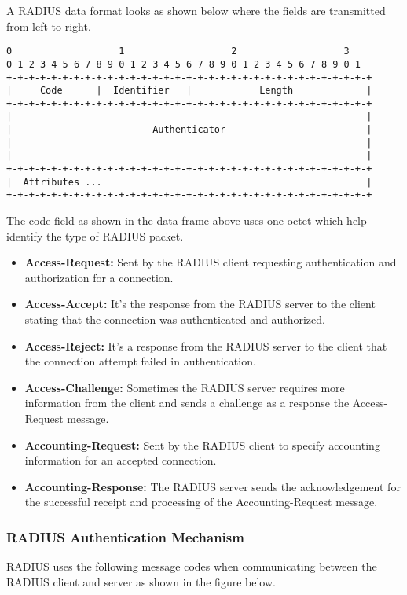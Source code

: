 A RADIUS data format looks as shown below where the fields are transmitted from left to right.

\begin{lstlisting}
0                   1                   2                   3
0 1 2 3 4 5 6 7 8 9 0 1 2 3 4 5 6 7 8 9 0 1 2 3 4 5 6 7 8 9 0 1
+-+-+-+-+-+-+-+-+-+-+-+-+-+-+-+-+-+-+-+-+-+-+-+-+-+-+-+-+-+-+-+-+
|     Code      |  Identifier   |            Length             |
+-+-+-+-+-+-+-+-+-+-+-+-+-+-+-+-+-+-+-+-+-+-+-+-+-+-+-+-+-+-+-+-+
|                                                               |
|                         Authenticator                         |
|                                                               |
|                                                               |
+-+-+-+-+-+-+-+-+-+-+-+-+-+-+-+-+-+-+-+-+-+-+-+-+-+-+-+-+-+-+-+-+
|  Attributes ...												|
+-+-+-+-+-+-+-+-+-+-+-+-+-+-+-+-+-+-+-+-+-+-+-+-+-+-+-+-+-+-+-+-+

\end{lstlisting}

The code field as shown in the data frame above uses one octet which help identify the type of RADIUS packet.
\begin{itemize}
	\item \textbf{Access-Request:} Sent by the RADIUS client requesting authentication and authorization for a connection.
	\item \textbf{Access-Accept:} It’s the response from the RADIUS server to the client stating that the connection was authenticated and authorized.
	\item \textbf{Access-Reject:} It’s a response from the RADIUS server to the client that the connection attempt failed in authentication.
	\item \textbf{Access-Challenge:} Sometimes the RADIUS server requires more information from the client and sends a challenge as a response the Access-Request message.
	\item \textbf{Accounting-Request:} Sent by the RADIUS client to specify accounting information for an accepted connection.
	\item \textbf{Accounting-Response:} The RADIUS server sends the acknowledgement for the successful receipt and processing of the Accounting-Request message.
	
\end{itemize}

\subsubsection{RADIUS Authentication Mechanism} \label{RADIUS_auth_mechanism}
RADIUS uses the following message codes when communicating between the RADIUS client and server as shown in the figure below.

